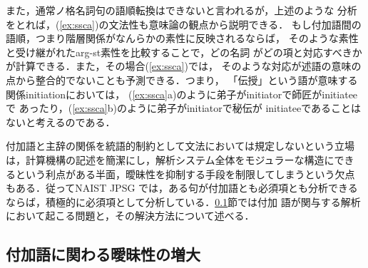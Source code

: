 また，通常ノ格名詞句の語順転換はできないと言われるが，上述のような
分析をとれば，(\ref{ex:ssca})の文法性も意味論の観点から説明できる．
もし付加語間の語順，つまり階層関係がなんらかの素性に反映されるならば，
そのような素性と受け継がれた{\sc arg-st}素性を比較することで，どの名詞
がどの項と対応すべきかが計算できる．また，その場合(\ref{ex:ssca})では，
そのような対応が述語の意味の点から整合的でないことも予測できる．つまり，
「伝授」という語が意味する関係{\sc initiation}においては，
(\ref{ex:ssca}a)のように弟子が{\sc initiator}で師匠が{\sc initiatee}で
あったり，(\ref{ex:ssca}b)のように弟子が{\sc initiator}で秘伝が{\sc
initiatee}であることはないと考えるのである．

付加語と主辞の関係を統語的制約として文法においては規定しないという立場
は，計算機構の記述を簡潔にし，解析システム全体をモジュラーな構造にでき
るという利点がある半面，曖昧性を抑制する手段を制限してしまうという欠点
もある．従ってNAIST JPSG では，ある句が付加語とも必須項とも分析できる
ならば，積極的に必須項として分析している．\ref{sec:adn:amb}節では付加
語が関与する解析において起こる問題と，その解決方法について述べる．


\subsection{付加語に関わる曖昧性の増大}\label{sec:adn:amb}

